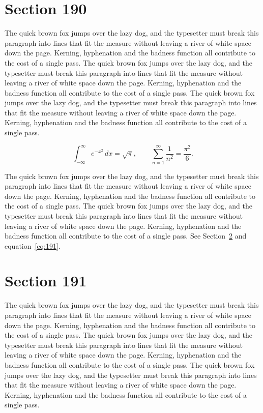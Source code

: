 \documentclass{article}
\begin{document}
\section{Section 190}
\label{sec:190}
The quick brown fox jumps over the lazy dog, and the typesetter must break this paragraph into lines that fit the measure without leaving a river of white space down the page. Kerning, hyphenation and the badness function all contribute to the cost of a single pass. The quick brown fox jumps over the lazy dog, and the typesetter must break this paragraph into lines that fit the measure without leaving a river of white space down the page. Kerning, hyphenation and the badness function all contribute to the cost of a single pass. The quick brown fox jumps over the lazy dog, and the typesetter must break this paragraph into lines that fit the measure without leaving a river of white space down the page. Kerning, hyphenation and the badness function all contribute to the cost of a single pass. 

\begin{equation}\label{eq:190}
\int_{-\infty}^{\infty} e^{-x^{2}}\,dx = \sqrt{\pi}, \qquad
\sum_{n=1}^{\infty} \frac{1}{n^{2}} = \frac{\pi^{2}}{6}.
\end{equation}

The quick brown fox jumps over the lazy dog, and the typesetter must break this paragraph into lines that fit the measure without leaving a river of white space down the page. Kerning, hyphenation and the badness function all contribute to the cost of a single pass. The quick brown fox jumps over the lazy dog, and the typesetter must break this paragraph into lines that fit the measure without leaving a river of white space down the page. Kerning, hyphenation and the badness function all contribute to the cost of a single pass. 
See Section~\ref{sec:191} and equation~\eqref{eq:191}.
\section{Section 191}
\label{sec:191}
The quick brown fox jumps over the lazy dog, and the typesetter must break this paragraph into lines that fit the measure without leaving a river of white space down the page. Kerning, hyphenation and the badness function all contribute to the cost of a single pass. The quick brown fox jumps over the lazy dog, and the typesetter must break this paragraph into lines that fit the measure without leaving a river of white space down the page. Kerning, hyphenation and the badness function all contribute to the cost of a single pass. The quick brown fox jumps over the lazy dog, and the typesetter must break this paragraph into lines that fit the measure without leaving a river of white space down the page. Kerning, hyphenation and the badness function all contribute to the cost of a single pass. 
\end{document}
